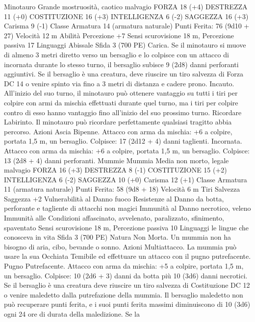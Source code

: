 \begin{multicols}{2}
Minotauro
Grande mostruosità, caotico malvagio
FORZA 18 (+4)
DESTREZZA 11 (+0)
COSTITUZIONE 16 (+3)
INTELLIGENZA 6 (-2)
SAGGEZZA 16 (+3)
Carisma 9 (-1)
Classe Armatura 14 (armatura naturale)
\hspace*{0pt}\hfill{Punti Ferita}: 76 (9d10 + 27)
Velocità 12 m
Abilità Percezione +7
Sensi scurovisione 18 m, Percezione passiva 17
Linguaggi Abissale
Sfida 3 (700 PE)
Carica. Se il minotauro si muove di almeno 3 metri diretto verso
un bersaglio e lo colpisce con un attacco di incornata durante lo
stesso turno, il bersaglio subisce 9 (2d8) danni perforanti
aggiuntivi. Se il bersaglio è una creatura, deve riuscire un tiro
salvezza di Forza DC 14 o venire spinto via fino a 3 metri di
distanza e cadere prono.
Incauto. All’inizio del suo turno, il minotauro può ottenere
vantaggio su tutti i tiri per colpire con armi da mischia effettuati
durante quel turno, ma i tiri per colpire contro di esso hanno
vantaggio fino all’inizio del suo prossimo turno.
Ricordare Labirinto. Il minotauro può ricordare perfettamente
qualsiasi tragitto abbia percorso.
Azioni
Ascia Bipenne. Attacco con arma da mischia: +6 a colpire,
portata 1,5 m, un bersaglio.
Colpisce: 17 (2d12 + 4) danni taglienti.
Incornata. Attacco con arma da mischia: +6 a colpire, portata
1,5 m, un bersaglio.
Colpisce: 13 (2d8 + 4) danni perforanti.
Mummie
Mummia
Media non morto, legale malvagio
FORZA 16 (+3)
DESTREZZA 8 (-1)
COSTITUZIONE 15 (+2)
INTELLIGENZA 6 (-2)
SAGGEZZA 10 (+0)
Carisma 12 (+1)
Classe Armatura 11 (armatura naturale)
\hspace*{0pt}\hfill{Punti Ferita}: 58 (9d8 + 18)
Velocità 6 m
Tiri Salvezza Saggezza +2
Vulnerabilità al Danno fuoco
Resistenze al Danno da botta, perforante e tagliente di
attacchi non magici
Immunità al Danno necrotico, veleno
Immunità alle Condizioni affascinato, avvelenato, paralizzato,
sfinimento, spaventato
Sensi scurovisione 18 m, Percezione passiva 10
Linguaggi le lingue che conosceva in vita
Sfida 3 (700 PE)
Natura Non Morta. Un mummia non ha bisogno di aria, cibo,
bevande o sonno.
Azioni
Multiattacco. La mummia può usare la sua Occhiata Temibile ed
effettuare un attacco con il pugno putrefacente.
Pugno Putrefacente. Attacco con arma da mischia: +5 a colpire,
portata 1,5 m, un bersaglio.
Colpisce: 10 (2d6 + 3) danni da botta più 10 (3d6) danni
necrotici. Se il bersaglio è una creatura deve riuscire un tiro
salvezza di Costituzione DC 12 o venire maledetto dalla
putrefazione della mummia. Il bersaglio maledetto non può
recuperare punti ferita, e i suoi punti ferita massimi diminuiscono
di 10 (3d6) ogni 24 ore di durata della maledizione. Se la

\end{multicols}
